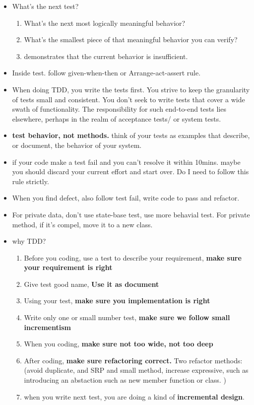 \documentclass[a4paper,11pt,twoside]{book}
\begin{document}
\begin{itemize}
	\item What's the next test? 
	\begin{enumerate}
		\item What's the next most logically meaningful behavior?
		\item What's the smallest piece of that meaningful behavior you can verify?
		\item demonstrates that the current behavior is insufficient.
	\end{enumerate}

	\item Inside test. follow given-when-then or Arrange-act-assert rule. 
		
	\item When doing TDD, you write the tests first. You strive to keep the granularity of tests small and consistent. You don't seek to write tests that cover a wide swath of functionality. The responsibility for such end-to-end tests lies elsewhere, perhaps in the realm of acceptance tests/ or system tests. 
	
	\item \textbf{test behavior, not methods.} think of your tests as examples that describe, or document, the behavior of your system. 
		
		\item if your code make a test fail and you can't resolve it within 10mins. maybe you should discard your current effort and start over. Do I need to follow this rule strictly. 
		
		\item When you find defect, also follow test fail, write code to pass and refactor.
		\item For private data,  don't use state-base test, use more behavial test. For private method, if it's compel, move it to a new class. 
		
		\item why TDD?
		\begin{enumerate}
			\item Before you coding, use a test to describe your requirement, \textbf{make sure your requirement is right}
			\item Give test good name, \textbf{Use it as document}
			\item Using your test, \textbf{make sure you implementation is right }
			\item Write only one or small number test, \textbf{make sure we follow small incrementism}
			\item When you coding, \textbf{make sure not too wide, not too deep}
			\item After coding, \textbf{make sure refactoring correct.} Two refactor methods: (avoid duplicate, and SRP and small method, increase expressive, such as introducing an abstaction such as new member function or class. )
			\item when you write next test, you are doing a kind of \textbf{incremental design}.
		\end{enumerate}
	
\end{itemize}
\end{document}
